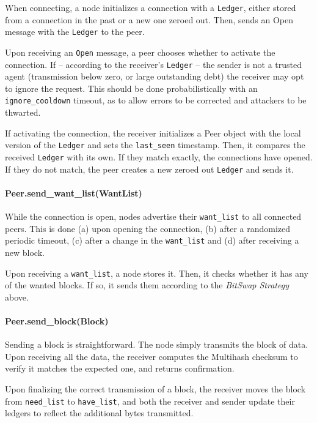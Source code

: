 \documentclass{sig-alternate}
\begin{document}
When connecting, a node initializes a connection with a
\texttt{Ledger}, either stored from a connection in the past or a new one
zeroed out. Then, sends an Open message with the \texttt{Ledger} to the peer.

Upon receiving an \texttt{Open} message, a peer chooses whether to activate
the connection. If -- according to the receiver's \texttt{Ledger} -- the sender
is not a trusted agent (transmission below zero, or large outstanding debt) the
receiver may opt to ignore the request. This should be done probabilistically
with an \texttt{ignore\_cooldown} timeout, as to allow errors to be corrected
and attackers to be thwarted.

If activating the connection, the receiver initializes a Peer object with the
local version of the \texttt{Ledger} and sets the \texttt{last\_seen}
timestamp. Then, it compares the received
\texttt{Ledger} with its own. If they match exactly, the connections have
opened. If they do not match, the peer creates a new zeroed out
\texttt{Ledger} and sends it.


\paragraph{Peer.send\_want\_list(WantList)}

While the connection is open, nodes advertise their
\texttt{want\_list} to all connected peers. This is done (a) upon opening the
connection, (b) after a randomized periodic timeout, (c) after a change in
the \texttt{want\_list} and (d) after receiving a new block.

Upon receiving a \texttt{want\_list}, a node stores it. Then, it checks whether
it has any of the wanted blocks. If so, it sends them according to the
\textit{BitSwap Strategy} above.

\paragraph{Peer.send\_block(Block)}

Sending a block is straightforward. The node simply transmits the block of
data. Upon receiving all the data, the receiver computes the Multihash
checksum to verify it matches the expected one, and returns confirmation.

Upon finalizing the correct transmission of a block, the receiver moves the
block from \texttt{need\_list} to \texttt{have\_list}, and both the receiver
and sender update their ledgers to reflect the additional bytes transmitted.
\end{document}
